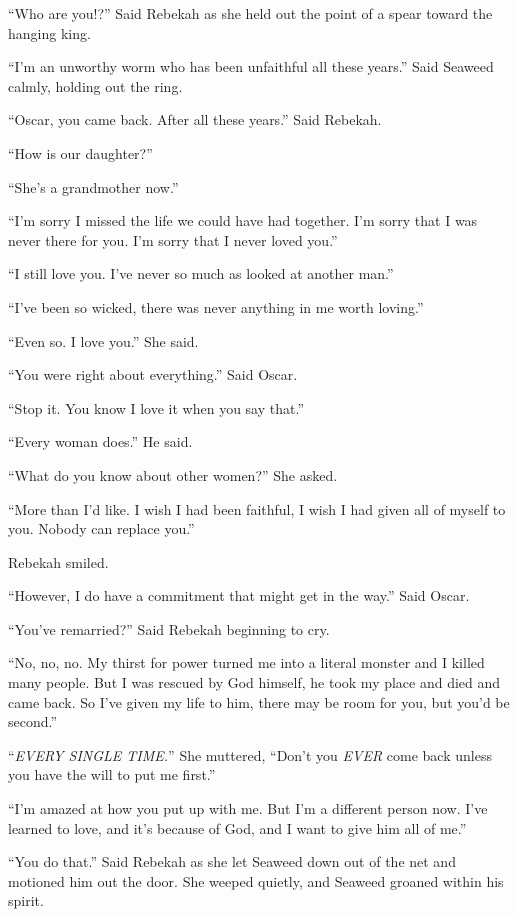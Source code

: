 ``Who are you!?'' Said Rebekah as she held out the point of a spear toward the hanging king.

``I'm an unworthy worm who has been unfaithful all these years.'' Said Seaweed calmly, holding out the ring.

``Oscar, you came back. After all these years.'' Said Rebekah.

``How is our daughter?''

``She's a grandmother now.''

``I'm sorry I missed the life we could have had together. I'm sorry that I was never there for you. I'm sorry that I never loved you.''

``I still love you. I've never so much as looked at another man.''

``I've been so wicked, there was never anything in me worth loving.''

``Even so. I love you.'' She said.

``You were right about everything.'' Said Oscar.

``Stop it. You know I love it when you say that.''

``Every woman does.'' He said.

``What do you know about other women?'' She asked.

``More than I'd like. I wish I had been faithful, I wish I had given all of myself to you. Nobody can replace you.''

Rebekah smiled.

``However, I do have a commitment that might get in the way.'' Said Oscar.

``You've remarried?'' Said Rebekah beginning to cry.

``No, no, no. My thirst for power turned me into a literal monster and I killed many people. But I was rescued by God himself, he took my place and died and came back. So I've given my life to him, there may be room for you, but you'd be second.''

``\emph{EVERY SINGLE TIME.}'' She muttered, ``Don't you \emph{EVER} come back unless you have the will to put me first.''

``I'm amazed at how you put up with me. But I'm a different person now. I've learned to love, and it's because of God, and I want to give him all of me.''

``You do that.'' Said Rebekah as she let Seaweed down out of the net and motioned him out the door. She weeped quietly, and Seaweed groaned within his spirit.

